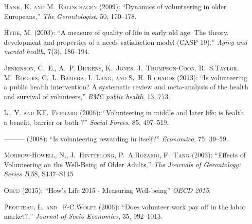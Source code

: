 \documentclass[10pt, letterpaper]{article}
\begin{document}
\begin{spacing}{1.4}
\begin{thebibliography}{87}
\textsc{Hank, K. and M.~Erlinghagen} (2009): \enquote{Dynamics of volunteering in older Europeans,} \emph{The Gerontologist}, 50, 170--178.  

\textsc{Hyde, M.} (2003): \enquote{A measure of quality of life in early old age: The theory, development and properties of a needs satisfaction model (CASP-19),} \emph{Aging and mental health}, 7(3), 186--194. 


\textsc{Jenkinson, C.~E., A.~P. Dickens, K.~Jones, J.~Thompson-Coon, R.~S.Taylor, M.~Rogers, C.~L. Bambra, I.~Lang, and S.~H. Richards} (2013):
  \enquote{Is volunteering a public health intervention? A systematic review and meta-analysis of the health and survival of volunteers,} \emph{BMC public health}, 13, 773.

\textsc{Li, Y. and KF.~Ferraro} (2006): \enquote{Volunteering in middle and later life: is health a benefit, barrier or both ?} \emph{Social Forces}, 85, 497--519. 


---\hspace{-.1pt}---\hspace{-.1pt}--- (2008{}): \enquote{Is volunteering rewarding in itself?} \emph{Economica}, 75, 39--59.

\textsc{Morrow-Howell, N., J.~Hinterlong, P.~A.Rozario, F.~Tang} (2003):
  \enquote{Effects of Volunteering on the Well-Being of Older Adults,} \emph{The Journals of Gerontology: Series B},58, S137--S145


\textsc{Oecd} (2015): \enquote{How's Life  2015 - Measuring Well-being} \emph{OECD 2015}.
  
\textsc{Prouteau, L. and ~F-C.Wolff } (2006): \enquote{Does volunteer work pay off in the labor market?,} \emph{Journal of Socio-Economics}, 35, 992--1013.


\end{thebibliography}
\end{spacing}
\end{document}
